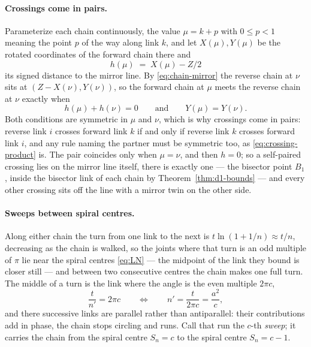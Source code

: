 \documentclass[11pt]{article}
\theoremstyle{definition}
\begin{document}
\paragraph{Crossings come in pairs.} Parameterize each chain continuously, the
value $\mu=k+p$ with $0\leq p<1$ meaning the point $p$ of the way along link
$k$, and let $X(\mu),Y(\mu)$ be the rotated coordinates of the forward chain
there and
\begin{equation}\label{eq:crossing-h}
h(\mu)\;=\;X(\mu)-Z/2
\end{equation}
its signed distance to the mirror line. By \eqref{eq:chain-mirror} the reverse
chain at $\nu$ sits at $(Z-X(\nu),Y(\nu))$, so the forward chain at $\mu$ meets
the reverse chain at $\nu$ exactly when
\begin{equation}\label{eq:crossing-conditions}
h(\mu)+h(\nu)=0
\qquad\text{and}\qquad
Y(\mu)=Y(\nu).
\end{equation}
Both conditions are symmetric in $\mu$ and $\nu$, which is why crossings come in
pairs: reverse link $i$ crosses forward link $k$ if and only if reverse link $k$
crosses forward link $i$, and any rule naming the partner must be symmetric
too, as \eqref{eq:crossing-product} is. The pair coincides only when $\mu=\nu$,
and then $h=0$; so a self-paired crossing lies on the mirror line itself, there
is exactly one — the bisector point $B_1$, inside the bisector link of each
chain by Theorem~\ref{thm:d1-bounds} — and every other crossing sits off the
line with a mirror twin on the other side.

\paragraph{Sweeps between spiral centres.} Along either chain the turn from one
link to the next is $t\ln(1+1/n)\approx t/n$, decreasing as the chain is walked,
so the joints where that turn is an odd multiple of $\pi$ lie near the
spiral centres \eqref{eq:LN} --- the midpoint of the link they bound is closer
still --- and between two consecutive centres the chain makes
one full turn.
The middle of a turn is the link where the angle is the even multiple $2\pi c$,
\begin{equation}\label{eq:crossing-sweep}
\frac{t}{n'}=2\pi c
\qquad\Longleftrightarrow\qquad
n'=\frac{t}{2\pi c}=\frac{a^{2}}{c} ,
\end{equation}
and there successive links are parallel rather than antiparallel: their
contributions add in phase, the chain stops circling and runs. Call that run
the $c$-th \emph{sweep}; it carries the chain from the spiral centre $S_n=c$ to
the spiral centre $S_n=c-1$.
\end{document}
